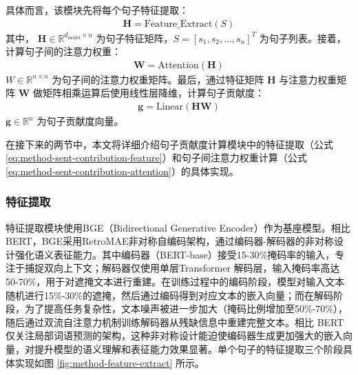 具体而言，该模块先将每个句子特征提取：
\begin{equation}
\begin{aligned}
    \textbf{H} = \text{Feature\_Extract}(S)
\end{aligned}
\label{eq:method-sent-contribution-feature}
\end{equation}
其中， \(\textbf{H} \in \mathbb{R}^{d_\text{model} \times n}\) 为句子特征矩阵，\(S = [s_1, s_2, \ldots, s_n]^T\) 为句子列表。接着，计算句子间的注意力权重：
\begin{equation}
\begin{aligned}
    \textbf{W} = \text{Attention}(\textbf{H})
\end{aligned}
\label{eq:method-sent-contribution-attention}
\end{equation}
\(W \in \mathbb{R}^{n \times n}\) 为句子间的注意力权重矩阵。最后，通过特征矩阵 $\textbf{H}$ 与注意力权重矩阵 $\textbf{W}$ 做矩阵相乘运算后使用线性层降维，计算句子贡献度：
\begin{equation}
\begin{aligned}
    \textbf{g} = \text{Linear}(\textbf{HW})
\end{aligned}
\label{eq:method-sent-contribution}
\end{equation}
\(\textbf{g} \in \mathbb{R}^{n}\) 为句子贡献度向量。

在接下来的两节中，本文将详细介绍句子贡献度计算模块中的特征提取（公式 \ref{eq:method-sent-contribution-feature}）和句子间注意力权重计算（公式 \ref{eq:method-sent-contribution-attention}）的具体实现。

\subsubsection{特征提取}

特征提取模块使用BGE（Bidirectional Generative Encoder）\cite{bge_embedding}作为基座模型。相比BERT，BGE采用RetroMAE非对称自编码架构，通过编码器-解码器的非对称设计强化语义表征能力。其中编码器（BERT-base）接受15-30\%掩码率的输入，专注于捕捉双向上下文；解码器仅使用单层Transformer 解码层，输入掩码率高达50-70\%，用于对遮掩文本进行重建。在训练过程中的编码阶段，模型对输入文本随机进行15\%-30\%的遮掩，然后通过编码得到对应文本的嵌入向量；而在解码阶段，为了提高任务复杂性，文本噪声被进一步加大（掩码比例增加至50\%-70\%），随后通过双流自注意力机制训练解码器从残缺信息中重建完整文本。相比 BERT 仅关注局部词语预测的架构，这种非对称设计能迫使编码器生成更加强大的嵌入向量，对提升模型的语义理解和表征能力效果显著。单个句子的特征提取三个阶段具体实现如图 \ref{fig:method-feature-extract} 所示。

